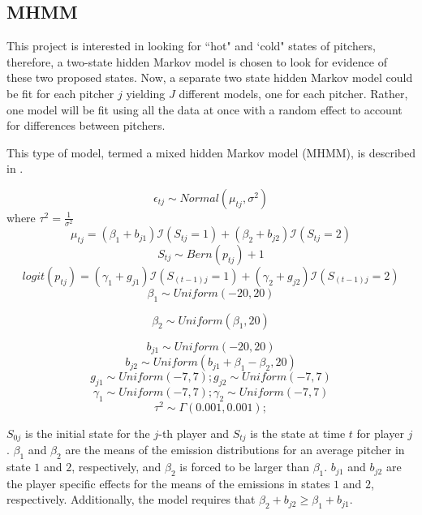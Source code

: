 \documentclass[letterpaper,12pt]{article}\usepackage[]{graphicx}\usepackage[]{color}
\begin{document}
\subsection{MHMM}
This project is interested in looking for ``hot" and `cold" states of pitchers, therefore, a two-state hidden Markov model is chosen to look for evidence of these two proposed states.  Now, a separate two state hidden Markov model could be fit for each pitcher $j$ yielding $J$ different models, one for each pitcher.  Rather, one model will be fit using all the data at once with a random effect to account for differences between pitchers. 



This type of model, termed a mixed hidden Markov model (MHMM), is described in \cite{Altman2007}. 

  




$$
\epsilon_{tj} \sim Normal(\mu_{tj},\sigma^2) 
$$
where $\tau^2=\frac{1}{\sigma^2}$
$$
\mu_{tj} = (\beta_1 + b_{j1})\mathcal{I}(S_{tj}=1) + (\beta_2 + b_{j2})\mathcal{I}(S_{tj}=2) 
$$
$$
S_{tj} \sim Bern(p_{tj}) + 1
$$
$$
logit(p_{tj}) =(\gamma_1 + g_{j1})\mathcal{I}(S_{(t-1)j}=1) + (\gamma_2 + g_{j2})\mathcal{I}(S_{(t-1)j}=2)
$$
$$
\beta_{1} \sim Uniform(-20,20)
$$

$$
\beta_{2} \sim Uniform(\beta_1,20) 
$$

$$
b_{j1} \sim Uniform(-20,20)
$$
$$
b_{j2} \sim Uniform(b_{j1}+\beta_1-\beta_2,20) 
$$
$$
g_{j1} \sim Uniform(-7,7);g_{j2} \sim Uniform(-7,7)
$$
$$
\gamma_1 \sim Uniform(-7,7);
\gamma_2 \sim Uniform(-7,7)
$$
$$
\tau^2 \sim \Gamma(0.001,0.001);
$$





$S_{0j}$ is the initial state for the $j$-th player and $S_{tj}$ is the state at time $t$ for player $j$.  $\beta_1$  and $\beta_2$ are the means of the emission distributions for an average pitcher in state $1$ and $2$, respectively, and $\beta_2$ is forced to be larger than $\beta_1$.  $b_{j1}$ and $b_{j2}$ are the player specific effects for the means of the emissions in states $1$ and $2$, respectively.  Additionally, the model requires that $\beta_2 + b_{j2} \ge \beta_1 + b_{j1}$.  
\end{document}
